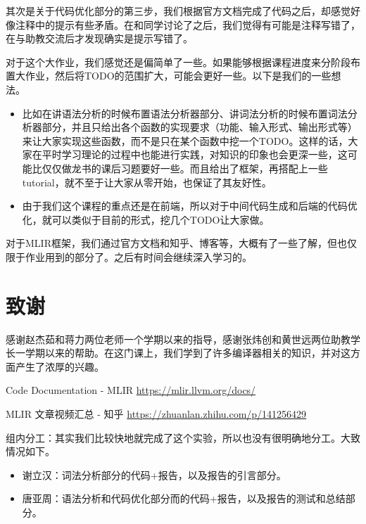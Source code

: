 \documentclass[lang=cn,11pt,a4paper]{elegantpaper}
\begin{document}
其次是关于代码优化部分的第三步，我们根据官方文档完成了代码之后，却感觉好像注释中的提示有些矛盾。在和同学讨论了之后，我们觉得有可能是注释写错了，在与助教交流后才发现确实是提示写错了。

对于这个大作业，我们感觉还是偏简单了一些。如果能够根据课程进度来分阶段布置大作业，然后将TODO的范围扩大，可能会更好一些。以下是我们的一些想法。
\begin{itemize}
    \item 比如在讲语法分析的时候布置语法分析器部分、讲词法分析的时候布置词法分析器部分，并且只给出各个函数的实现要求（功能、输入形式、输出形式等）来让大家实现这些函数，而不是只在某个函数中挖一个TODO。这样的话，大家在平时学习理论的过程中也能进行实践，对知识的印象也会更深一些，这可能比仅仅做龙书的课后习题要好一些。而且给出了框架，再搭配上一些tutorial，就不至于让大家从零开始，也保证了其友好性。
    \item 由于我们这个课程的重点还是在前端，所以对于中间代码生成和后端的代码优化，就可以类似于目前的形式，挖几个TODO让大家做。
\end{itemize}

对于MLIR框架，我们通过官方文档和知乎、博客等，大概有了一些了解，但也仅限于作业用到的部分了。之后有时间会继续深入学习的。

\section{致谢}

感谢赵杰茹和蒋力两位老师一个学期以来的指导，感谢张炜创和黄世远两位助教学长一学期以来的帮助。在这门课上，我们学到了许多编译器相关的知识，并对这方面产生了浓厚的兴趣。

\renewcommand\refname{参考文献}
\begin{thebibliography}{99}

 Code Documentation - MLIR \href{https://mlir.llvm.org/docs/}{https://mlir.llvm.org/docs/}

 MLIR 文章视频汇总 - 知乎 \href{https://zhuanlan.zhihu.com/p/141256429}{https://zhuanlan.zhihu.com/p/141256429}

\end{thebibliography}


\appendix
\appendixpage
\addappheadtotoc

组内分工：其实我们比较快地就完成了这个实验，所以也没有很明确地分工。大致情况如下。

\begin{itemize}
  \item 谢立汉：词法分析部分的代码+报告，以及报告的引言部分。
  \item 唐亚周：语法分析和代码优化部分而的代码+报告，以及报告的测试和总结部分。
\end{itemize}
\end{document}
